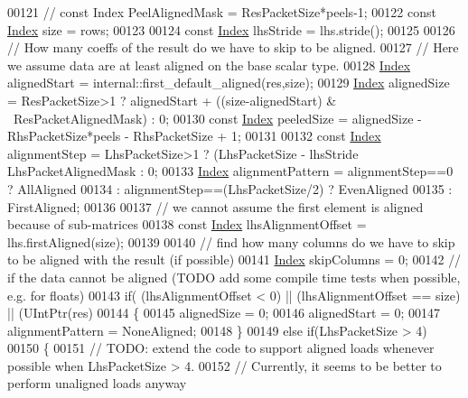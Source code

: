 \begin{DoxyCode}
00121 \textcolor{comment}{//  const Index PeelAlignedMask = ResPacketSize*peels-1;}
00122   \textcolor{keyword}{const} \hyperlink{namespace_eigen_a62e77e0933482dafde8fe197d9a2cfde}{Index} size = rows;
00123 
00124   \textcolor{keyword}{const} \hyperlink{namespace_eigen_a62e77e0933482dafde8fe197d9a2cfde}{Index} lhsStride = lhs.stride();
00125 
00126   \textcolor{comment}{// How many coeffs of the result do we have to skip to be aligned.}
00127   \textcolor{comment}{// Here we assume data are at least aligned on the base scalar type.}
00128   \hyperlink{namespace_eigen_a62e77e0933482dafde8fe197d9a2cfde}{Index} alignedStart = internal::first\_default\_aligned(res,size);
00129   \hyperlink{namespace_eigen_a62e77e0933482dafde8fe197d9a2cfde}{Index} alignedSize = ResPacketSize>1 ? alignedStart + ((size-alignedStart) & ~ResPacketAlignedMask) :
       0;
00130   \textcolor{keyword}{const} \hyperlink{namespace_eigen_a62e77e0933482dafde8fe197d9a2cfde}{Index} peeledSize = alignedSize - RhsPacketSize*peels - RhsPacketSize + 1;
00131 
00132   \textcolor{keyword}{const} \hyperlink{namespace_eigen_a62e77e0933482dafde8fe197d9a2cfde}{Index} alignmentStep = LhsPacketSize>1 ? (LhsPacketSize - lhsStride %
      LhsPacketAlignedMask : 0;
00133   \hyperlink{namespace_eigen_a62e77e0933482dafde8fe197d9a2cfde}{Index} alignmentPattern = alignmentStep==0 ? AllAligned
00134                        : alignmentStep==(LhsPacketSize/2) ? EvenAligned
00135                        : FirstAligned;
00136 
00137   \textcolor{comment}{// we cannot assume the first element is aligned because of sub-matrices}
00138   \textcolor{keyword}{const} \hyperlink{namespace_eigen_a62e77e0933482dafde8fe197d9a2cfde}{Index} lhsAlignmentOffset = lhs.firstAligned(size);
00139 
00140   \textcolor{comment}{// find how many columns do we have to skip to be aligned with the result (if possible)}
00141   \hyperlink{namespace_eigen_a62e77e0933482dafde8fe197d9a2cfde}{Index} skipColumns = 0;
00142   \textcolor{comment}{// if the data cannot be aligned (TODO add some compile time tests when possible, e.g. for floats)}
00143   \textcolor{keywordflow}{if}( (lhsAlignmentOffset < 0) || (lhsAlignmentOffset == size) || (UIntPtr(res)%
00144   \{
00145     alignedSize = 0;
00146     alignedStart = 0;
00147     alignmentPattern = NoneAligned;
00148   \}
00149   \textcolor{keywordflow}{else} \textcolor{keywordflow}{if}(LhsPacketSize > 4)
00150   \{
00151     \textcolor{comment}{// TODO: extend the code to support aligned loads whenever possible when LhsPacketSize > 4.}
00152     \textcolor{comment}{// Currently, it seems to be better to perform unaligned loads anyway}

\end{DoxyCode}
